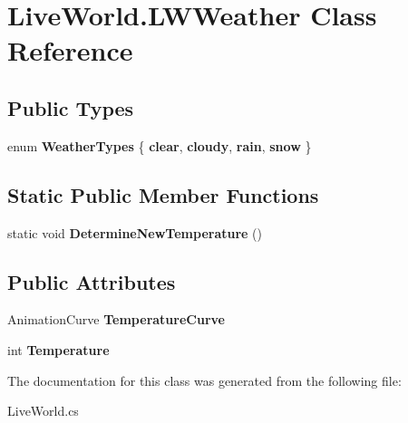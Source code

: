 \hypertarget{class_live_world_1_1_l_w_weather}{}\section{Live\+World.\+L\+W\+Weather Class Reference}
\label{class_live_world_1_1_l_w_weather}
\subsection*{Public Types}
\begin{DoxyCompactItemize}
\item 
\hypertarget{class_live_world_1_1_l_w_weather_af94e6eb75c60f5cf47f23d5ea019052c}{}enum {\bfseries Weather\+Types} \{ {\bfseries clear}, 
{\bfseries cloudy}, 
{\bfseries rain}, 
{\bfseries snow}
 \}\label{class_live_world_1_1_l_w_weather_af94e6eb75c60f5cf47f23d5ea019052c}

\end{DoxyCompactItemize}
\subsection*{Static Public Member Functions}
\begin{DoxyCompactItemize}
\item 
\hypertarget{class_live_world_1_1_l_w_weather_a61b0a367c4e37fe884b0201507e7384c}{}static void {\bfseries Determine\+New\+Temperature} ()\label{class_live_world_1_1_l_w_weather_a61b0a367c4e37fe884b0201507e7384c}

\end{DoxyCompactItemize}
\subsection*{Public Attributes}
\begin{DoxyCompactItemize}
\item 
\hypertarget{class_live_world_1_1_l_w_weather_a6a53da3a1bd9623d1bd4b2ce050b5ab3}{}Animation\+Curve {\bfseries Temperature\+Curve}\label{class_live_world_1_1_l_w_weather_a6a53da3a1bd9623d1bd4b2ce050b5ab3}

\item 
\hypertarget{class_live_world_1_1_l_w_weather_a7948acd1d021f74daff398907607f3a5}{}int {\bfseries Temperature}\label{class_live_world_1_1_l_w_weather_a7948acd1d021f74daff398907607f3a5}

\end{DoxyCompactItemize}


The documentation for this class was generated from the following file\+:\begin{DoxyCompactItemize}
\item 
Live\+World.\+cs\end{DoxyCompactItemize}
